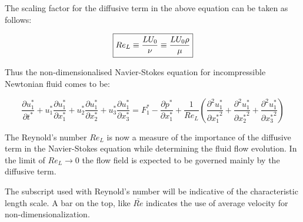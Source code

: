 The scaling factor for the diffusive term in the above equation can be taken as follows:

\begin{equation}
\boxed{ 
Re_L \equiv {L U_0 \over \nu} \equiv {L U_0 \rho \over \mu}
}
\end{equation}

Thus the non-dimensionalised Navier-Stokes equation for incompressible Newtonian fluid comes to be:

\begin{equation}
\frac{\partial u_1^*}{\partial t^*} + u_1^* \frac{\partial u_1^*}{\partial x_1^*} + u_2^* \frac{\partial u_1^*}{\partial x_2^*} + u_3^* \frac{\partial u_1^*}{\partial x_3^*} = F_1^* -  \frac{\partial p^*}{\partial x_1^*} + \frac{1}{Re_L} \left( \frac{\partial^2 u_1^*}{\partial {x_1^*}^2} + \frac{\partial^2 u_1^*}{\partial {x_2^*}^2} + \frac{\partial^2 u_1^*}{\partial {x_3^*}^2} \right)
\end{equation} 

The Reynold's number  $Re_L$ is now a measure of the importance of the diffusive term in the Navier-Stokes equation while determining the fluid flow evolution. In the limit of $Re_L \to 0$ the flow field is expected to be governed mainly by the diffusive term. 


The subscript used with Reynold's number will be indicative of the characteristic length scale. A bar on the top, like $\bar{Re}$ indicates the use of average velocity for non-dimensionalization. 

